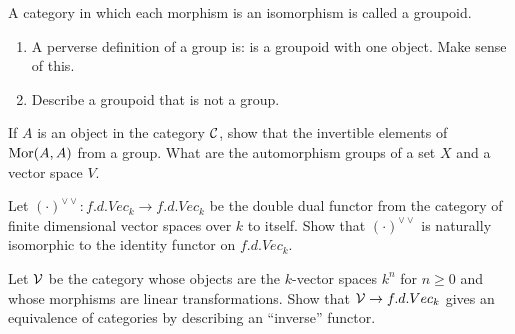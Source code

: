 
\begin{exercise}
    A category in which each morphism is an isomorphism is called a groupoid. 
    \begin{enumerate}[label = (\alph*)]
        \item A perverse definition of a group is: is a groupoid with one object. Make sense of this. 
        \item Describe a groupoid that is not a group. 
    \end{enumerate}
\end{exercise}

\begin{exercise}
    If $A$ is an object in the category $\mathcal{C}$, show that the invertible elements of $\text{Mor}(A, A)$ from a group. What are the automorphism groups of a set $X$ and a vector space $V$. 
\end{exercise}

\begin{exercise}
    Let $(\cdot)^{\vee \vee}: f.d.Vec_k \to f.d.Vec_k$ be the double dual functor from the category of finite dimensional vector spaces over $k$ to itself. Show that $(\cdot)^{\vee \vee}$ is naturally isomorphic to the identity functor on $f.d.Vec_k$. 
\end{exercise}

\begin{exercise}
    Let $\mathcal{V}$ be the category whose objects are the $k$-vector spaces $k^n$ for $n \ge 0$ and whose morphisms are linear transformations. Show that $\mathcal{V} \to f.d.Vec_k$ gives an equivalence of categories by describing an ``inverse'' functor.
\end{exercise}